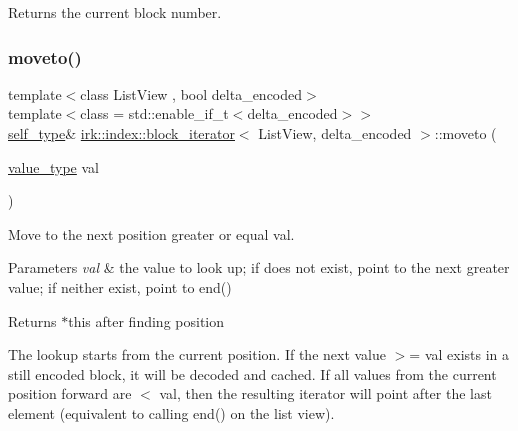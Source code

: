 Returns the current block number. 

\mbox{\label{classirk_1_1index_1_1block__iterator_a1809157e963a0ec3569c5abc50467810}} 
\subsubsection{\texorpdfstring{moveto()}{moveto()}}
{\footnotesize\ttfamily template$<$class List\+View , bool delta\+\_\+encoded$>$ \\
template$<$class  = std\+::enable\+\_\+if\+\_\+t$<$delta\+\_\+encoded$>$$>$ \\
\mbox{\hyperlink{classirk_1_1index_1_1block__iterator_a338ee8fee726492e9f8bbad4b4d75766}{self\+\_\+type}}\& \mbox{\hyperlink{classirk_1_1index_1_1block__iterator}{irk\+::index\+::block\+\_\+iterator}}$<$ List\+View, delta\+\_\+encoded $>$\+::moveto (\begin{DoxyParamCaption}\item[{\mbox{\hyperlink{classirk_1_1index_1_1block__iterator_a4d6c5b58cedd871e8a8f235e425e8587}{value\+\_\+type}}}]{val }\end{DoxyParamCaption})\hspace{0.3cm}{\ttfamily [inline]}}



Move to the next position greater or equal {\ttfamily val}. 


\begin{DoxyParams}{Parameters}
{\em val} & the value to look up; if does not exist, point to the next greater value; if neither exist, point to {\ttfamily end()} \\
\hline
\end{DoxyParams}
\begin{DoxyReturn}{Returns}
{\ttfamily $\ast$this} after finding position
\end{DoxyReturn}
The lookup starts from the current position. If the next value {\ttfamily $>$= val} exists in a still encoded block, it will be decoded and cached. If all values from the current position forward are {\ttfamily $<$ val}, then the resulting iterator will point after the last element (equivalent to calling {\ttfamily end()} on the list view). \mbox{\label{classirk_1_1index_1_1block__iterator_aae123dcccac278876262bf6514669e43}} 
